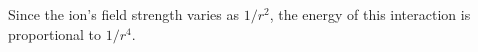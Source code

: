 Since the ion's field strength varies as $1/r^2$, the energy of this interaction is proportional to $1/r^4$.
